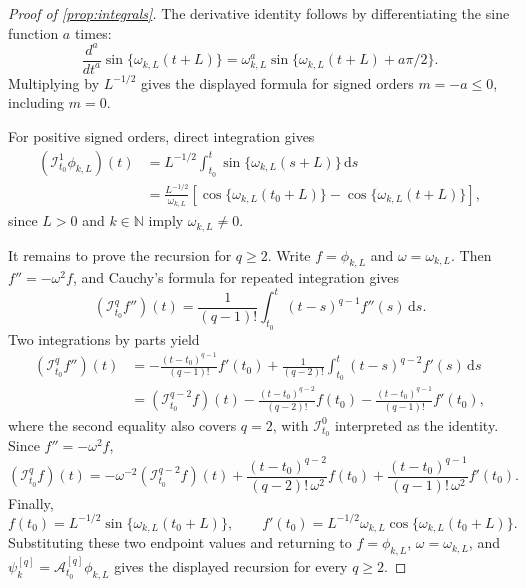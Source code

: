 \documentclass[11pt,a4paper]{article}
\theoremstyle{definition}
\theoremstyle{remark}
\begin{document}
\begin{proof}[Proof of \cref{prop:integrals}]
The derivative identity follows by differentiating the sine function \(a\) times:
\[
\frac{d^a}{dt^a}\sin\{\omega_{k,L}(t+L)\}
=
\omega_{k,L}^{a}\sin\{\omega_{k,L}(t+L)+a\pi/2\}.
\]
Multiplying by \(L^{-1/2}\) gives the displayed formula for signed orders \(m=-a\le0\), including \(m=0\).

For positive signed orders, direct integration gives
\begin{align*}
(\mathcal I_{t_0}^{1}\phi_{k,L})(t)
&=
L^{-1/2}\int_{t_0}^t \sin\{\omega_{k,L}(s+L)\}\,\mathrm ds\\
&=
\frac{L^{-1/2}}{\omega_{k,L}}
\left[
\cos\{\omega_{k,L}(t_0+L)\}-\cos\{\omega_{k,L}(t+L)\}
\right],
\end{align*}
since \(L>0\) and \(k\in\mathbb N\) imply \(\omega_{k,L}\neq0\).

It remains to prove the recursion for \(q\ge2\). Write \(f=\phi_{k,L}\) and \(\omega=\omega_{k,L}\). Then \(f''=-\omega^2 f\), and Cauchy's formula for repeated integration gives
\[
(\mathcal I_{t_0}^q f'')(t)
=
\frac{1}{(q-1)!}\int_{t_0}^t (t-s)^{q-1}f''(s)\,\mathrm ds.
\]
Two integrations by parts yield
\begin{align*}
(\mathcal I_{t_0}^q f'')(t)
&=
-\frac{(t-t_0)^{q-1}}{(q-1)!}f'(t_0)
+
\frac{1}{(q-2)!}\int_{t_0}^t (t-s)^{q-2}f'(s)\,\mathrm ds\\
&=
(\mathcal I_{t_0}^{q-2}f)(t)
-
\frac{(t-t_0)^{q-2}}{(q-2)!}f(t_0)
-
\frac{(t-t_0)^{q-1}}{(q-1)!}f'(t_0),
\end{align*}
where the second equality also covers \(q=2\), with \(\mathcal I_{t_0}^0\) interpreted as the identity. Since \(f''=-\omega^2 f\),
\[
(\mathcal I_{t_0}^q f)(t)
=
-\omega^{-2}(\mathcal I_{t_0}^{q-2}f)(t)
+
\frac{(t-t_0)^{q-2}}{(q-2)!\,\omega^2}f(t_0)
+
\frac{(t-t_0)^{q-1}}{(q-1)!\,\omega^2}f'(t_0).
\]
Finally,
\[
f(t_0)=L^{-1/2}\sin\{\omega_{k,L}(t_0+L)\},
\qquad
f'(t_0)=L^{-1/2}\omega_{k,L}\cos\{\omega_{k,L}(t_0+L)\}.
\]
Substituting these two endpoint values and returning to \(f=\phi_{k,L}\), \(\omega=\omega_{k,L}\), and \(\psi_k^{[q]}=\mathcal A_{t_0}^{[q]}\phi_{k,L}\) gives the displayed recursion for every \(q\ge2\).
\end{proof}
\end{document}
